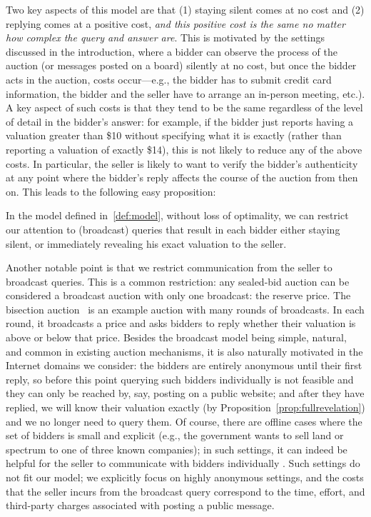 Two key aspects of this model are that (1) staying silent comes at no cost
and (2) replying comes at a positive cost, {\em and this positive cost is
  the same no matter how complex the query and answer are}.  This is
motivated by the settings discussed in the introduction, where a bidder can
observe the process of the auction (or messages posted on a board) silently
at no cost, but once the bidder acts in the auction, costs occur---e.g., the
bidder has to submit credit card information, the bidder and the seller
have to arrange an in-person meeting, etc.).  A key aspect of such costs is
that they tend to be the same regardless of the level of detail in the
bidder's answer: for example, if the bidder just reports having a valuation
greater than \$10 without specifying what it is exactly (rather than
reporting a valuation of exactly \$14), this is not likely to reduce any of
the above costs.  In particular, the seller is likely to want to verify the
bidder's authenticity at any point where the bidder's reply affects the
course of the auction from then on.  
This leads to the following easy proposition:

\begin{proposition}
\label{prop:fullrevelation}
  In the model defined in~\ref{def:model}, without loss of optimality, we
  can restrict our attention to (broadcast) queries that result in each
  bidder either staying silent, or immediately revealing his exact
  valuation to the seller.
\end{proposition}

Another notable point is that we restrict communication from the seller to
broadcast queries.  This is a common restriction: any sealed-bid auction
can be considered a broadcast auction with only one broadcast: the reserve
price.  The bisection auction~\cite{Herings2009:BisectionAuction} is an
example auction with many rounds of broadcasts. In each round, it
broadcasts a price and asks bidders to reply whether their valuation is
above or below that price.  Besides the broadcast model being simple,
natural, and common in existing auction mechanisms, it is also naturally
motivated in the Internet domains we consider: the bidders are entirely
anonymous until their first reply, so before this point querying such
bidders individually is not feasible and they can only be reached by, say,
posting on a public website; and after they have replied, we will know
their valuation exactly (by Proposition~\ref{prop:fullrevelation}) and we no
longer need to query them.  Of course, there are offline cases where the
set of bidders is small and explicit (e.g., the government wants to sell
land or spectrum to one of three known companies); in such settings, it can
indeed be helpful for the seller to communicate with bidders individually
\cite{McAfee88:SearchMechanisms,Sandholm06:Sequences}.  Such settings do
not fit our model; we explicitly focus on highly anonymous settings, and
the costs that the seller incurs from the broadcast query correspond to the
time, effort, and third-party charges associated with posting a public
message.


